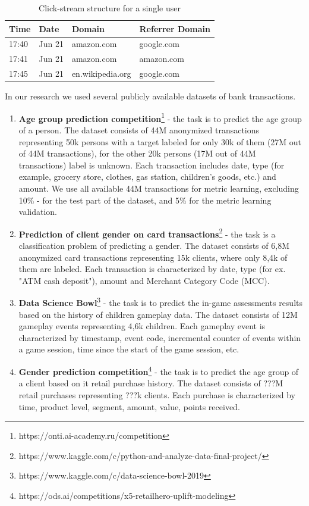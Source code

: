 \documentclass{article}
\begin{document}
\begin{table}
\centering
\caption{Click-stream structure for a single user}
\begin{tabular}{llll}
\toprule
\textbf{Time} & \textbf{Date} & \textbf{Domain} & \textbf{Referrer Domain} \\
\midrule
17:40 & Jun 21 & amazon.com & google.com \\
17:41 & Jun 21 & amazon.com & amazon.com \\
17:45 & Jun 21 & en.wikipedia.org & google.com \\
\bottomrule
\end{tabular}
\label{tab-cs-data}
\end{table}






In our research we used several publicly available datasets of bank transactions.
\begin{enumerate}
    \item \textbf{Age group prediction competition}\footnote{https://onti.ai-academy.ru/competition} - the task is to predict the age group of a person. The dataset consists of 44M anonymized transactions representing 50k persons with a target labeled for only 30k of them (27M out of 44M transactions), for the other 20k persons (17M out of 44M transactions) label is unknown. Each transaction includes date, type (for example, grocery store, clothes, gas station, children's goods, etc.) and amount. We use all available 44M transactions for metric learning, excluding 10\% - for the test part of the dataset, and  5\% for the metric learning validation.
        
    \item \textbf{Prediction of client gender on card transactions}\footnote{https://www.kaggle.com/c/python-and-analyze-data-final-project/} - the task is a classification problem of predicting a gender. The dataset consists of 6,8M anonymized card transactions representing 15k clients, where only 8,4k of them are labeled. Each transaction is characterized by date, type (for ex. "ATM cash deposit"), amount and Merchant Category Code (MCC).
    
    \item \textbf{Data Science Bowl}\footnote{https://www.kaggle.com/c/data-science-bowl-2019} - the task is to predict the in-game assessments results based on the history of children gameplay data. The dataset consists of 12M gameplay events representing 4,6k children. Each gameplay event is characterized by timestamp, event code, incremental counter of events within a game session, time since the start of the game session, etc.
    
    \item \textbf{Gender prediction competition}\footnote{https://ods.ai/competitions/x5-retailhero-uplift-modeling} - the task is to predict the age group of a client based on it retail purchase history. The dataset consists of ???M retail purchases representing ???k clients. Each purchase is characterized by time, product level, segment, amount, value, points received.

\end{enumerate}
\end{document}
